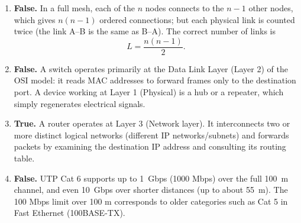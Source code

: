 \documentclass[11pt]{article}
\newcommand{\cle}[1]{{\popxbold\color{popdark}#1}}
\begin{document}
\begin{corrige}
\begin{enumerate}
\item \textbf{False.} In a full mesh, each of the $n$ nodes connects to the $n-1$ other nodes, which gives $n(n-1)$ ordered connections; but each physical link is counted twice (the link A–B is the same as B–A). The correct number of links is
\[ L = \frac{n(n-1)}{2}. \]
\item \textbf{False.} A switch operates primarily at the \cle{Data Link Layer (Layer 2)} of the OSI model: it reads MAC addresses to forward frames only to the destination port. A device working at Layer 1 (Physical) is a hub or a repeater, which simply regenerates electrical signals.
\item \textbf{True.} A router operates at Layer 3 (Network layer). It interconnects two or more distinct logical networks (different IP networks/subnets) and forwards packets by examining the destination \cle{IP address} and consulting its routing table.
\item \textbf{False.} UTP Cat 6 supports up to \SI{1}{Gbps} (1000 Mbps) over the full \SI{100}{m} channel, and even \SI{10}{Gbps} over shorter distances (up to about \SI{55}{m}). The 100 Mbps limit over 100 m corresponds to older categories such as Cat 5 in Fast Ethernet (100BASE-TX).
\end{enumerate}
\end{corrige}
\end{document}

